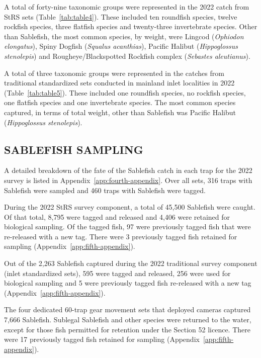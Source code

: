 \documentclass[12pt]{article}\usepackage[]{graphicx}\usepackage[]{color}
\begin{document}
A total of forty-nine taxonomic groups were represented in the 2022 catch from StRS sets (Table~\ref{tab:table4}). These included ten roundfish species, twelve rockfish species, three flatfish species and twenty-three invertebrate species. Other than Sablefish, the most common species, by weight, were Lingcod (\emph{Ophiodon elongatus}), Spiny Dogfish (\emph{Squalus acanthias}), Pacific Halibut (\emph{Hippoglossus stenolepis}) and Rougheye/Blackspotted Rockfish complex (\emph{Sebastes aleutianus}).

A total of three taxonomic groups were represented in the catches from traditional standardized sets conducted in mainland inlet localities in 2022 (Table~\ref{tab:table5}). These included one roundfish species, no rockfish species, one flatfish species and one invertebrate species. The most common species captured, in terms of total weight, other than Sablefish was Pacific Halibut (\emph{Hippoglossus stenolepis}).

\hypertarget{sablefish-sampling}{%
\subsection{SABLEFISH SAMPLING}\label{sablefish-sampling}}

A detailed breakdown of the fate of the Sablefish catch in each trap for the 2022 survey is listed in Appendix~\ref{app:fourth-appendix}. Over all sets, 316 traps with Sablefish were sampled and 460 traps with Sablefish were tagged.

During the 2022 StRS survey component, a total of 45,500 Sablefish were caught. Of that total, 8,795 were tagged and released and 4,406 were retained for biological sampling. Of the tagged fish, 97 were previously tagged fish that were re-released with a new tag. There were 3 previously tagged fish retained for sampling (Appendix~\ref{app:fifth-appendix}).

Out of the 2,263 Sablefish captured during the 2022 traditional survey component (inlet standardized sets), 595 were tagged and released, 256 were used for biological sampling and 5 were previously tagged fish re-released with a new tag (Appendix~\ref{app:fifth-appendix}).

The four dedicated 60-trap gear movement sets that deployed cameras captured 7,666 Sablefish. Sublegal Sablefish and other species were returned to the water, except for those fish permitted for retention under the Section 52 licence. There were 17 previously tagged fish retained for sampling (Appendix~\ref{app:fifth-appendix}).
\end{document}
